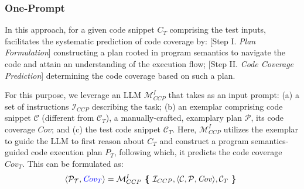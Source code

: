 \subsubsection{One-Prompt {\cctool}}
In this approach, for a given code snippet $C_T$ comprising the test inputs, {\cctool} facilitates the systematic prediction of code coverage by: [Step I. \textit{Plan Formulation}] constructing a plan rooted in program semantics to navigate the code and attain an understanding of the execution flow; [Step II. \textit{Code Coverage Prediction}] determining the code coverage based on such a plan. 

For this purpose, we leverage an LLM $\mathcal{M}_{CCP}^{I}$ that takes as an input prompt: (a) a set of instructions $\mathcal{I}_{CCP}$ describing the task; (b) an exemplar comprising code snippet $\mathcal{C}$ (different from $\mathcal{C}_T$), a manually-crafted, examplary plan $\mathcal{P}$, 
its code coverage $\mathit{Cov}$; and (c) the test code snippet $\mathcal{C}_T$.
Here, $\mathcal{M}_{CCP}^{I}$ utilizes the exemplar to guide the LLM to first reason about $C_T$ and construct a program semantics-guided code execution plan $P_T$, following which, it predicts the code coverage $\mathit{Cov}_T$.
This can be formulated as:
\begin{equation}
\langle \mathcal{P_T}, \textcolor{blue}{\mathit{Cov}_{T}} \rangle = \mathcal{M}_{CCP}^{I} \textbf{\ \{\ } \mathcal{I}_{CCP}, \langle \mathcal{C}, \mathcal{P}, \mathit{Cov} \rangle, \mathcal{C}_T \textbf{\ \}\ }  
\end{equation}






